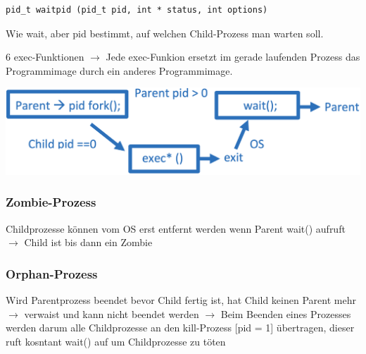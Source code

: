 \begin{multicols*}{5}
		\vspace{-5pt}

		\begin{lstlisting}
pid_t waitpid (pid_t pid, int * status, int options)
		\end{lstlisting}
		\vspace{-5pt}
		\begin{compactitem}[$\bullet$]
			\item Wie wait, aber pid bestimmt, auf welchen Child-Prozess man warten soll.
		\end{compactitem}
		
		\vspace{-2pt}

		\drule{\linewidth}{1pt}
	
		6 \textcolor{h}{exec-Funktionen} $\rightarrow$ Jede exec-Funkion ersetzt im gerade laufenden Prozess das Programmimage durch ein anderes Programmimage.\\

		\vspace{-7pt}

			\begin{center}
				\includegraphics[scale=0.15]{./Graphic/exec.png}
			\end{center}

		\vspace{-7pt}


	\subsubsection{Zombie-Prozess}
	Childprozesse können vom OS erst entfernt werden wenn Parent wait() aufruft $\rightarrow$ Child ist bis dann ein Zombie
			


	\subsubsection{Orphan-Prozess}
	Wird Parentprozess beendet bevor Child fertig ist, hat Child keinen Parent mehr $\rightarrow$ verwaist und kann nicht beendet werden $\rightarrow$ Beim Beenden eines Prozesses werden darum alle Childprozesse an den kill-Prozess [pid = 1] übertragen, dieser ruft kosntant wait() auf um Childprozesse zu töten
		




\end{multicols*}
